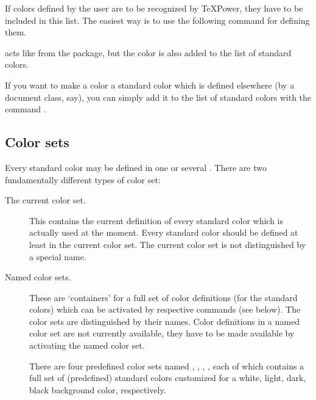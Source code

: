 \documentclass[12pt]{scrartcl}
\let\newslide=\relax
\begin{document}
  If colors defined by the user are to be recognized by \TeX Power, they have to be included in this list. The easiest
  way is to use the following command for defining them.

  \newslide

   acts like 
   from the  package, but the color
   is also added to the list of standard colors.

  If you want to make a color a standard color which is defined elsewhere (by a document class, say), you can simply add
  it to the list of standard colors with the command
  .

  \newslide

  \subsection{Color sets}
  Every standard color may be defined in one or several . There are two fundamentally different
  types of color set:
  \begin{description}
  \item[The current color set.] This contains the current definition of every standard color which is actually used at
    the moment. Every standard color should be defined at least in the current color set. The current color set is not
    distinguished by a special name.

    \newslide

  \item[Named color sets.] These are `containers' for a full set of color definitions (for the standard colors) which
    can be activated by respective commands (see below). The color sets are distinguished by their names. Color
    definitions in a named color set are not currently available, they have to be made available by activating the named
    color set.

    There are four predefined color sets named ,
    , ,
    , each of which contains a full set of (predefined)
    standard colors customized for a white, light, dark, black background
    color, respectively.
  \end{description}
\end{document}
